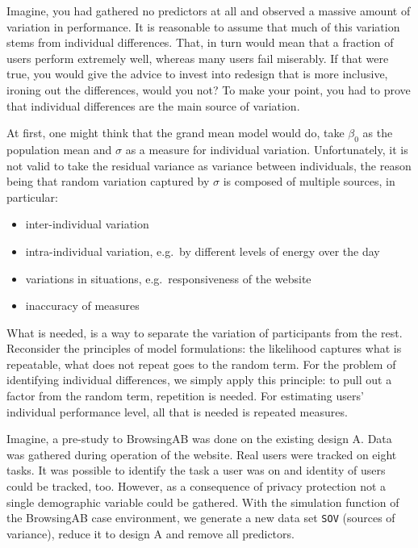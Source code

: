 \documentclass[]{svmono}
\providecommand{\tightlist}{%
  \setlength{\itemsep}{0pt}\setlength{\parskip}{0pt}}
\begin{document}
Imagine, you had gathered no predictors at all and observed a massive
amount of variation in performance. It is reasonable to assume that much
of this variation stems from individual differences. That, in turn would
mean that a fraction of users perform extremely well, whereas many users
fail miserably. If that were true, you would give the advice to invest
into redesign that is more inclusive, ironing out the differences, would
you not? To make your point, you had to prove that individual
differences are the main source of variation.

At first, one might think that the grand mean model would do, take
\(\beta_0\) as the population mean and \(\sigma\) as a measure for
individual variation. Unfortunately, it is not valid to take the
residual variance as variance between individuals, the reason being that
random variation captured by \(\sigma\) is composed of multiple sources,
in particular:

\begin{itemize}
\tightlist
\item
  inter-individual variation
\item
  intra-individual variation, e.g.~by different levels of energy over
  the day
\item
  variations in situations, e.g.~responsiveness of the website
\item
  inaccuracy of measures
\end{itemize}

What is needed, is a way to separate the variation of participants from
the rest. Reconsider the principles of model formulations: the
likelihood captures what is repeatable, what does not repeat goes to the
random term. For the problem of identifying individual differences, we
simply apply this principle: to pull out a factor from the random term,
repetition is needed. For estimating users' individual performance
level, all that is needed is repeated measures.

Imagine, a pre-study to BrowsingAB was done on the existing design A.
Data was gathered during operation of the website. Real users were
tracked on eight tasks. It was possible to identify the task a user was
on and identity of users could be tracked, too. However, as a
consequence of privacy protection not a single demographic variable
could be gathered. With the simulation function of the BrowsingAB case
environment, we generate a new data set \texttt{SOV} (sources of
variance), reduce it to design A and remove all predictors.
\end{document}

